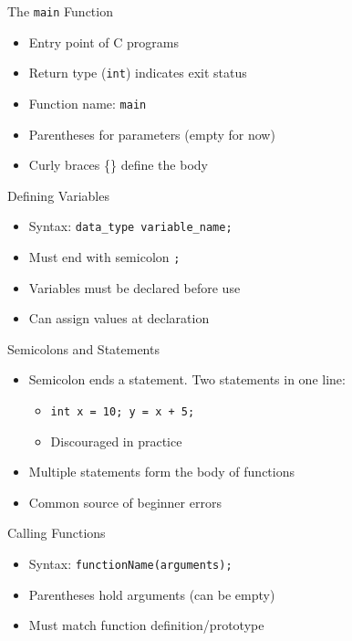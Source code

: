 \documentclass[12pt, aspectratio=169]{beamer}
\begin{document}
    \begin{frame}{The \texttt{main} Function}
        \begin{itemize}
            \item Entry point of C programs
            \item Return type (\texttt{int}) indicates exit status
            \item Function name: \texttt{main}
            \item Parentheses for parameters (empty for now)
            \item Curly braces \{\} define the body
        \end{itemize}
    \end{frame}


    \begin{frame}{Defining Variables}
        \begin{itemize}
            \item Syntax: \texttt{data\_type variable\_name;}
            \item Must end with semicolon \texttt{;}
            \item Variables must be declared before use
            \item Can assign values at declaration
        \end{itemize}
    \end{frame}


    \begin{frame}{Semicolons and Statements}
        \begin{itemize}
            \item Semicolon ends a statement. Two statements in one line:
            \begin{itemize}
                \item \texttt{int x = 10; y = x + 5;}
                \item Discouraged in practice
            \end{itemize}
            \item Multiple statements form the body of functions
            \item Common source of beginner errors
        \end{itemize}
    \end{frame}


    \begin{frame}{Calling Functions}
        \begin{itemize}
            \item Syntax: \texttt{functionName(arguments);}
            \item Parentheses hold arguments (can be empty)
            \item Must match function definition/prototype
        \end{itemize}
    \end{frame}
\end{document}
